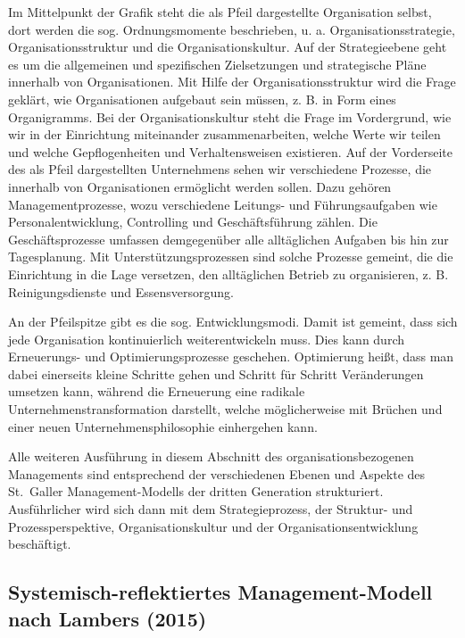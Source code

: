 \documentclass[
  letterpaper,
]{book}
\begin{document}
Im Mittelpunkt der Grafik steht die als Pfeil dargestellte Organisation
selbst, dort werden die sog. Ordnungsmomente beschrieben, u. a.
Organisationsstrategie, Organisationsstruktur und die
Organisationskultur. Auf der Strategieebene geht es um die allgemeinen
und spezifischen Zielsetzungen und strategische Pläne innerhalb von
Organisationen. Mit Hilfe der Organisationsstruktur wird die Frage
geklärt, wie Organisationen aufgebaut sein müssen, z. B. in Form eines
Organigramms. Bei der Organisationskultur steht die Frage im
Vordergrund, wie wir in der Einrichtung miteinander zusammenarbeiten,
welche Werte wir teilen und welche Gepflogenheiten und Verhaltensweisen
existieren. Auf der Vorderseite des als Pfeil dargestellten Unternehmens
sehen wir verschiedene Prozesse, die innerhalb von Organisationen
ermöglicht werden sollen. Dazu gehören Managementprozesse, wozu
verschiedene Leitungs- und Führungsaufgaben wie Personalentwicklung,
Controlling und Geschäftsführung zählen. Die Geschäftsprozesse umfassen
demgegenüber alle alltäglichen Aufgaben bis hin zur Tagesplanung. Mit
Unterstützungsprozessen sind solche Prozesse gemeint, die die
Einrichtung in die Lage versetzen, den alltäglichen Betrieb zu
organisieren, z. B. Reinigungsdienste und Essensversorgung.

An der Pfeilspitze gibt es die sog. Entwicklungsmodi. Damit ist gemeint,
dass sich jede Organisation kontinuierlich weiterentwickeln muss. Dies
kann durch Erneuerungs- und Optimierungsprozesse geschehen. Optimierung
heißt, dass man dabei einerseits kleine Schritte gehen und Schritt für
Schritt Veränderungen umsetzen kann, während die Erneuerung eine
radikale Unternehmenstransformation darstellt, welche möglicherweise mit
Brüchen und einer neuen Unternehmensphilosophie einhergehen kann.

Alle weiteren Ausführung in diesem Abschnitt des organisationsbezogenen
Managements sind entsprechend der verschiedenen Ebenen und Aspekte des
St.~Galler Management-Modells der dritten Generation strukturiert.
Ausführlicher wird sich dann mit dem Strategieprozess, der Struktur- und
Prozessperspektive, Organisationskultur und der Organisationsentwicklung
beschäftigt.

\subsection{Systemisch-reflektiertes Management-Modell nach Lambers
(2015)}\label{systemisch-reflektiertes-management-modell-nach-lambers-2015}
\end{document}
